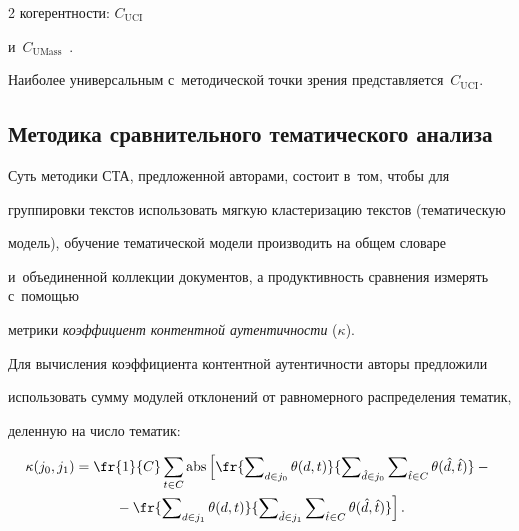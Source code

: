\begin{multicols}{2}
когерентности: $C_{\mathrm{UCI}}$~\cite{Newman2010} 


и~$C_{\mathrm{UMass}}$~\cite{mimno2011optimizing}. 


    Наиболее универсальным с~методической точки зрения представляется~$C_{\mathrm{UCI}}$. 





    \subsection{Методика сравнительного тематического анализа}


    


  


    Суть методики СТА, предложенной авторами, состоит в~том, чтобы для 


группировки текстов использовать мягкую кластеризацию текстов (тематическую 


модель), обучение тематической модели производить на общем словаре 


и~объединенной коллекции документов, а продуктивность сравнения измерять с~помощью 


метрики \textit{коэффициент контентной аутентичности} ($\kappa$).





  


    Для вычисления коэффициента контентной аутентичности авторы предложили 


использовать сумму модулей отклонений от равномерного распределения тематик, 


деленную на число тематик:


    \begin{multline*}


    \kappa (j_0,j_1) = \fr{1}{C} \sum\limits_{t \in C} \mathrm{abs} 


    \left[ \fr{\sum\nolimits_{d \in 


j_0} \theta(d,t)}{\sum\nolimits_{\hat{d} \in j_0}\sum\nolimits_{\hat{t} \in C} 


\theta(\hat{d},\hat{t})} -{}\right.\\


\left.{}- \fr{\sum\nolimits_{d \in j_1} \theta(d,t)}{\sum\nolimits_{\hat{d} \in 


j_1}\sum\nolimits_{\hat{t} \in C} \theta(\hat{d},\hat{t})} \right].


    \end{multline*}



\end{multicols}

